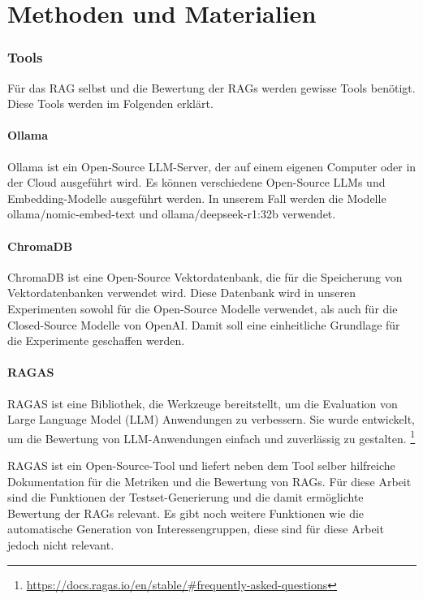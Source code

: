 \chapter{Methoden und Materialien}

\subsection{Tools}

Für das RAG selbst und die Bewertung der RAGs werden gewisse Tools benötigt.
Diese Tools werden im Folgenden erklärt.

\subsubsection{Ollama}
Ollama ist ein Open-Source LLM-Server, der auf einem eigenen Computer oder in der Cloud ausgeführt wird.
Es können verschiedene Open-Source LLMs und Embedding-Modelle ausgeführt werden. In unserem Fall werden die Modelle ollama/nomic-embed-text und ollama/deepseek-r1:32b verwendet.

\subsubsection{ChromaDB}
ChromaDB ist eine Open-Source Vektordatenbank, die für die Speicherung von Vektordatenbanken verwendet wird.
Diese Datenbank wird in unseren Experimenten sowohl für die Open-Source Modelle verwendet, als auch für die Closed-Source Modelle von OpenAI.
Damit soll eine einheitliche Grundlage für die Experimente geschaffen werden.

\subsubsection{RAGAS}
RAGAS ist eine Bibliothek, die Werkzeuge bereitstellt, um die Evaluation von Large Language Model (LLM) Anwendungen zu verbessern.
Sie wurde entwickelt, um die Bewertung von LLM-Anwendungen einfach und zuverlässig zu gestalten.
\footnote{\url{https://docs.ragas.io/en/stable/#frequently-asked-questions}}

RAGAS ist ein Open-Source-Tool und liefert neben dem Tool selber hilfreiche Dokumentation für die Metriken und die Bewertung von RAGs.
Für diese Arbeit sind die Funktionen der Testset-Generierung und die damit ermöglichte Bewertung der RAGs relevant.
Es gibt noch weitere Funktionen wie die automatische Generation von Interessengruppen, diese sind für diese Arbeit jedoch nicht relevant.

